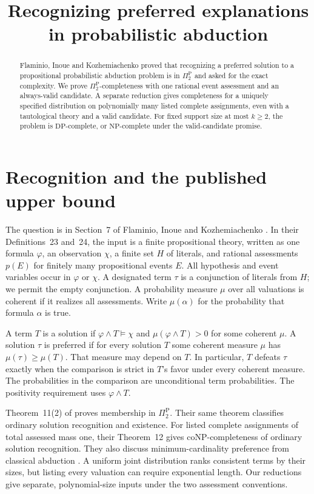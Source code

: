 \documentclass[11pt,a4paper]{amsart}
\title[Preferred explanations in probabilistic abduction]{Recognizing preferred explanations in probabilistic abduction}
\date{}
\newcommand{\DP}{\mathrm{DP}}
\newcommand{\NP}{\mathrm{NP}}
\newcommand{\coNP}{\mathrm{coNP}}
\begin{document}
\begin{abstract}
Flaminio, Inoue and Kozhemiachenko proved that recognizing a preferred solution to a propositional probabilistic abduction problem is in $\Pi_2^{\mathrm P}$ and asked for the exact complexity. We prove $\Pi_2^{\mathrm P}$-completeness with one rational event assessment and an always-valid candidate. A separate reduction gives completeness for a uniquely specified distribution on polynomially many listed complete assignments, even with a tautological theory and a valid candidate. For fixed support size at most $k\geq2$, the problem is $\DP$-complete, or $\NP$-complete under the valid-candidate promise.
\end{abstract}
\maketitle

\section{Recognition and the published upper bound}
The question is in Section~7 of Flaminio, Inoue and Kozhemiachenko \cite[p.~324]{fik}. In their Definitions~23 and~24, the input is a finite propositional theory, written as one formula $\varphi$, an observation $\chi$, a finite set $H$ of literals, and rational assessments $p(E)$ for finitely many propositional events $E$. All hypothesis and event variables occur in $\varphi$ or $\chi$. A designated term $\tau$ is a conjunction of literals from $H$; we permit the empty conjunction. A probability measure $\mu$ over all valuations is coherent if it realizes all assessments. Write $\mu(\alpha)$ for the probability that formula $\alpha$ is true.

A term $T$ is a solution if $\varphi\land T\models\chi$ and $\mu(\varphi\land T)>0$ for some coherent $\mu$. A solution $\tau$ is preferred if for every solution $T$ some coherent measure $\mu$ has $\mu(\tau)\geq\mu(T)$. That measure may depend on $T$. In particular, $T$ defeats $\tau$ exactly when the comparison is strict in $T$'s favor under every coherent measure. The probabilities in the comparison are unconditional term probabilities. The positivity requirement uses $\varphi\land T$.

Theorem~11(2) of \cite[p.~323]{fik} proves membership in $\Pi_2^{\mathrm P}$. Their same theorem classifies ordinary solution recognition and existence. For listed complete assignments of total assessed mass one, their Theorem~12 gives $\coNP$-completeness of ordinary solution recognition. They also discuss minimum-cardinality preference from classical abduction \cite[Section~4.2]{eg}. A uniform joint distribution ranks consistent terms by their sizes, but listing every valuation can require exponential length. Our reductions give separate, polynomial-size inputs under the two assessment conventions.
\end{document}
